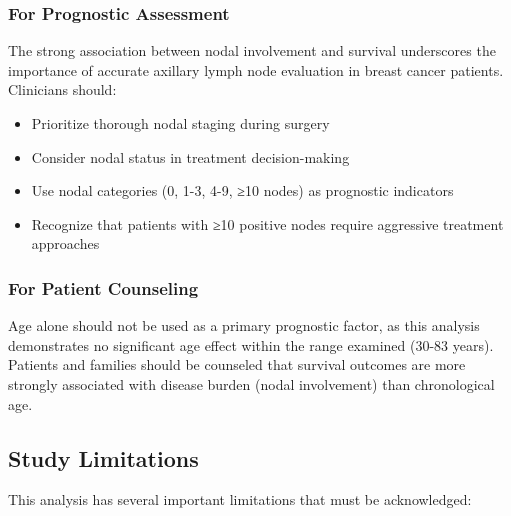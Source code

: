 \documentclass[12pt,a4paper]{article}
\begin{document}
\subsubsection{For Prognostic Assessment}

The strong association between nodal involvement and survival underscores the importance of accurate axillary lymph node evaluation in breast cancer patients. Clinicians should:

\begin{itemize}
    \item Prioritize thorough nodal staging during surgery
    \item Consider nodal status in treatment decision-making
    \item Use nodal categories (0, 1-3, 4-9, ≥10 nodes) as prognostic indicators
    \item Recognize that patients with ≥10 positive nodes require aggressive treatment approaches
\end{itemize}

\subsubsection{For Patient Counseling}

Age alone should not be used as a primary prognostic factor, as this analysis demonstrates no significant age effect within the range examined (30-83 years). Patients and families should be counseled that survival outcomes are more strongly associated with disease burden (nodal involvement) than chronological age.

\subsection{Study Limitations}

This analysis has several important limitations that must be acknowledged:
\end{document}
